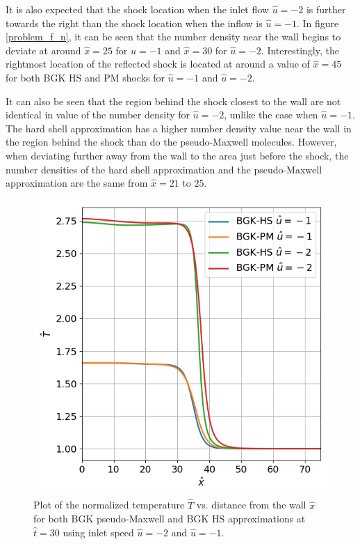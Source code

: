\documentclass[a4paper]{article}
\begin{document}
It is also expected that the shock location when the inlet flow $\hat{u} = -2$ is further towards the right than the shock location when the inflow is $\hat{u} = -1$. In figure \ref{problem_f_n}, it can be seen that the number density near the wall begins to deviate at around $\hat{x} = 25$ for $\hat{u} = -1$ and $\hat{x} = 30$ for $\hat{u} = -2$. Interestingly, the rightmost location of the reflected shock is located at around a value of $\hat{x} = 45$ for both BGK HS and PM shocks for $\hat{u} = -1$ and $\hat{u} = -2$.

It can also be seen that the region behind the shock closest to the wall are not identical in value of the number density for $\hat{u} = -2$, unlike the case when $\hat{u} = -1$. The hard shell approximation has a higher number density value near the wall in the region behind the shock than do the pseudo-Maxwell molecules. However, when deviating further away from the wall to the area just before the shock, the number densities of the hard shell approximation and the pseudo-Maxwell approximation are the same from $\hat{x} = 21$ to $25$. 
\clearpage
\begin{figure}[hbt!]
    \centering
    \includegraphics[width=14cm]{plots/problem_f_T.png}
    \caption{\centering Plot of the normalized temperature $\hat{T}$ vs. distance from the wall $\hat{x}$ for both BGK pseudo-Maxwell and BGK HS approximations at $\hat{t} = 30$ using inlet speed $\hat{u} = -2$ and $\hat{u} = -1$.}
    \label{problem_f_T}
\end{figure}
\end{document}

